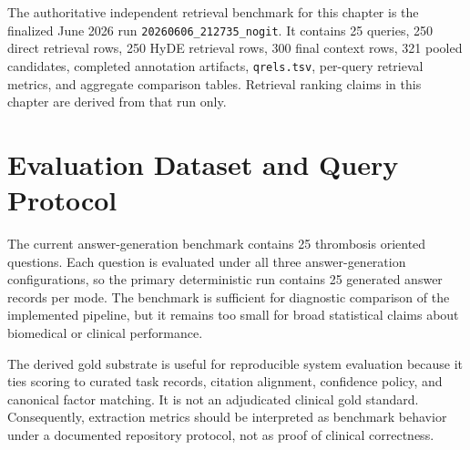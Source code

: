 The authoritative independent retrieval benchmark for this chapter is the finalized June 2026 run \texttt{20260606\_212735\_nogit}. It contains 25 queries, 250 direct retrieval rows, 250 HyDE retrieval rows, 300 final context rows, 321 pooled candidates, completed annotation artifacts, \texttt{qrels.tsv}, per-query retrieval metrics, and aggregate comparison tables. Retrieval ranking claims in this chapter are derived from that run only.

\section{Evaluation Dataset and Query Protocol}

The current answer-generation benchmark contains 25 thrombosis oriented questions. Each question is evaluated under all three answer-generation configurations, so the primary deterministic run contains 25 generated answer records per mode. The benchmark is sufficient for diagnostic comparison of the implemented pipeline, but it remains too small for broad statistical claims about biomedical or clinical performance.

The derived gold substrate is useful for reproducible system evaluation because it ties scoring to curated task records, citation alignment, confidence policy, and canonical factor matching. It is not an adjudicated clinical gold standard. Consequently, extraction metrics should be interpreted as benchmark behavior under a documented repository protocol, not as proof of clinical correctness.

